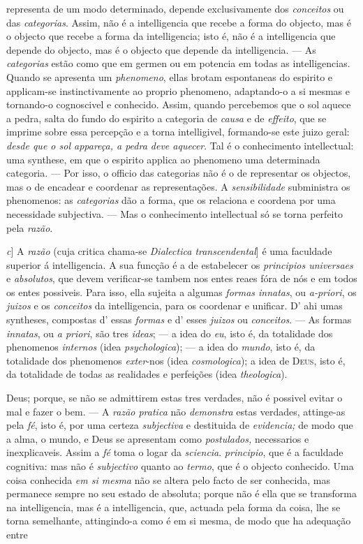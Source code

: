 representa de um modo determinado, depende exclusivamente dos \emph{conceitos} ou das \emph{categorias}. Assim, não é a intelligencia que recebe a forma do objecto, mas é o objecto que recebe a forma da intelligencia; isto é, não é a intelligencia que depende do objecto, mas é o objecto que depende da intelligencia. --- As \emph{categorias} estão como que em germen ou em potencia em todas as intelligencias. Quando se apresenta um \emph{phenomeno}, ellas brotam espontaneas do espirito e applicam-se instinctivamente ao proprio phenomeno, adaptando-o a si mesmas e tornando-o cognoscivel e conhecido. Assim, quando percebemos que o sol aquece a pedra, salta do fundo do espirito a categoria de \emph{causa} e de \emph{effeito}, que se imprime sobre essa percepção e a torna intelligivel, formando-se este juizo geral: \emph{desde que o sol appareça, a pedra deve aquecer}. Tal é o conhecimento intellectual: uma synthese, em que o espirito applica ao phenomeno uma determinada categoria. --- Por isso, o officio das categorias não é o de representar os objectos, mas o de encadear e coordenar as representações. A \emph{sensibilidade} subministra os phenomenos: as \emph{categorias} dão a forma, que os relaciona e coordena por uma necessidade subjectiva. --- Mas o conhecimento intellectual só se torna perfeito pela \emph{razão}.\par \emph{c}] A \emph{razão} (cuja critica chama-se \emph{Dialectica transcendental}] é uma faculdade superior á intelligencia. A sua funcção é a de estabelecer os \emph{principios universaes} e \emph{absolutos}, que devem verificar-se tambem nos entes reaes fóra de nós e em todos os entes possiveis. Para isso, ella sujeita a algumas \emph{formas innatas}, ou \emph{a-priori}, os \emph{juizos} e os \emph{conceitos} da intelligencia, para os coordenar e unificar. D' ahi umas syntheses, compostas d' essas \emph{formas} e d' esses \emph{juizos} ou \emph{conceitos}. --- As formas \emph{innatas}, ou \emph{a priori}, são tres \emph{ideas}; --- a idea do \emph{eu}, isto é, da totalidade dos phenomenos \emph{internos} (idea \emph{psychologica}); --- a idea do \emph{mundo}, isto é, da totalidade dos phenomenos \emph{exter}-nos (idea \emph{cosmologica}); a idea de \textsc{Deus}, isto é, da totalidade de todas as realidades e perfeições (idea \emph{theologica}).\par Deus; porque, se não se admittirem estas tres verdades, não é possivel evitar o mal e fazer o bem. --- A \emph{razão pratica} não \emph{demonstra} estas verdades, attinge-as pela \emph{fé}, isto é, por uma certeza \emph{subjectiva} e destituida de \emph{evidencia;} de modo que a alma, o mundo, e Deus se apresentam como \emph{postulados,} necessarios e inexplicaveis. Assim a \emph{fé} toma o logar da \emph{sciencia}. \emph{principio}, que é a faculdade cognitiva: mas não é \emph{subjectivo} quanto ao \emph{termo}, que é o objecto conhecido. Uma coisa conhecida \emph{em si mesma} não se altera pelo facto de ser conhecida, mas permanece sempre no seu estado de absoluta; porque não é ella que se transforma na intelligencia, mas é a intelligencia, que, actuada pela forma da coisa, lhe se torna semelhante, attingindo-a como é em si mesma, de modo que ha adequação entre 